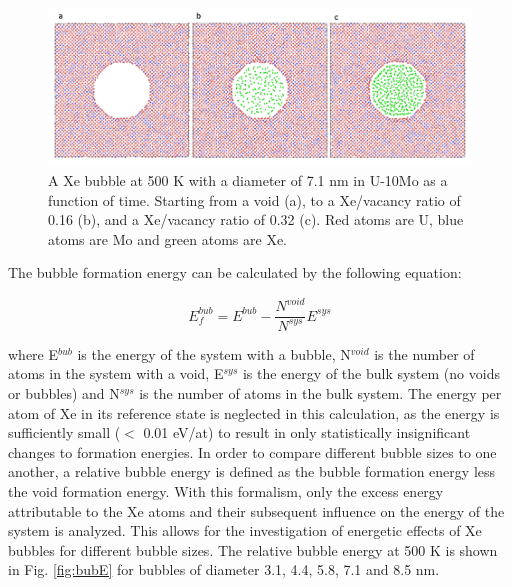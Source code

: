 \documentclass[review]{elsarticle}
\begin{document}
\begin{figure}[h]
 \centering
 \includegraphics[width=1.0\textwidth]{2_bubex.png} 
 \caption{A Xe bubble at 500 K with a diameter of 7.1 nm in U-10Mo as a function of time. Starting from a void (a), to a Xe/vacancy ratio of 0.16 (b), and a Xe/vacancy ratio of 0.32 (c). Red atoms are U, blue atoms are Mo and green atoms are Xe. }
 \label{fig:bubex}
\end{figure}

\FloatBarrier

The bubble formation energy can be calculated by the following equation:

\begin{equation}
\label{eq:bubE}
E_f^{bub}= E^{bub}-\frac{N^{void}}{N^{sys}}E^{sys}
\end{equation}

where E$^{bub}$ is the energy of the system with a bubble, N$^{void}$ is the number of atoms in the system with a void, E$^{sys}$ is the energy of the bulk system (no voids or bubbles) and N$^{sys}$ is the number of atoms in the bulk system. The energy per atom of Xe in its reference state is neglected in this calculation, as the energy is sufficiently small ($<$ 0.01 eV/at) to result in only statistically insignificant changes to formation energies. In order to compare different bubble sizes to one another, a relative bubble energy is defined as the bubble formation energy less the void formation energy. With this formalism, only the excess energy attributable to the Xe atoms and their subsequent influence on the energy of the system is analyzed. This allows for the investigation of energetic effects of Xe bubbles for different bubble sizes. The relative bubble energy at 500 K is shown in Fig. \ref{fig:bubE} for bubbles of diameter 3.1, 4.4, 5.8, 7.1 and 8.5 nm. 
\end{document}
